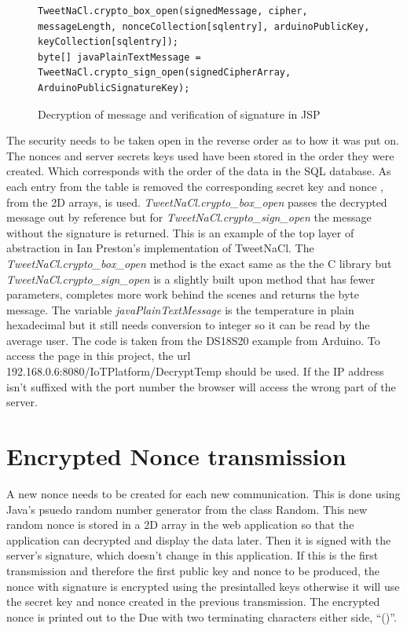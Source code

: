 \begin{figure}[H]
\begin{lstlisting}[style=Java]
TweetNaCl.crypto_box_open(signedMessage, cipher, messageLength, nonceCollection[sqlentry], arduinoPublicKey, keyCollection[sqlentry]);
byte[] javaPlainTextMessage = TweetNaCl.crypto_sign_open(signedCipherArray, ArduinoPublicSignatureKey);
\end{lstlisting}
\caption{Decryption of message and verification of signature in JSP}
\label{snip:decryptjsp}
\end{figure}

The security needs to be taken open in the reverse order as to how it was put on. The nonces and server secrets keys used have been stored in the order they were created. Which corresponds with the order of the data in the SQL database. As each entry from the table is removed the corresponding secret key and nonce , from the 2D arrays, is used. \emph{TweetNaCl.crypto\_box\_open} passes the decrypted message out by reference but for \emph{TweetNaCl.crypto\_sign\_open} the message without the signature is returned. This is an example of the top layer of abstraction in Ian Preston's implementation of TweetNaCl. The  \emph{TweetNaCl.crypto\_box\_open} method is the exact same as the the C library but \emph{TweetNaCl.crypto\_sign\_open} is a slightly built upon method that has fewer parameters, completes more work behind the scenes and returns the byte message. The variable \emph{javaPlainTextMessage} is the temperature in plain hexadecimal but it still needs conversion to integer so it can be read by the average user. The code is taken from the DS18S20 example from Arduino. To access the page in this project, the url 192.168.0.6:8080/IoTPlatform/DecryptTemp should be used. If the IP address isn't suffixed with the port number the browser will access the wrong part of the server.

\section{Encrypted Nonce transmission}
\label{nonce}
A new nonce needs to be created for each new communication. This is done using Java's psuedo random number generator from the class Random. This new random nonce is stored in a 2D array in the web application so that the application can decrypted and display the data later. Then it is signed with the server's signature, which doesn't change in this application. If this is the first transmission and therefore the first public key and nonce to be produced, the nonce with signature is encrypted using the presintalled keys otherwise it will use the secret key and nonce created in the previous transmission. The encrypted nonce is printed out to the Due with two terminating characters either side, ``()''.

